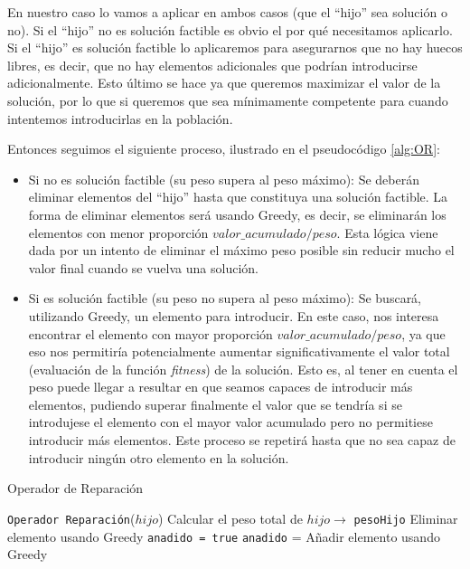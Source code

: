 En nuestro caso lo vamos a aplicar en ambos casos (que el ``hijo'' sea solución o no). 
Si el ``hijo'' no es solución factible es obvio el por qué necesitamos aplicarlo. 
Si el ``hijo'' es solución factible lo aplicaremos para asegurarnos que no hay huecos libres, es decir, que no hay elementos adicionales que podrían introducirse adicionalmente. 
Esto último se hace ya que queremos maximizar el valor de la solución, por lo que si queremos que sea mínimamente competente para cuando intentemos introducirlas en la población. 

Entonces seguimos el siguiente proceso, ilustrado en el pseudocódigo \ref{alg:OR}:
\begin{itemize}
	\item Si no es solución factible (su peso supera al peso máximo): Se deberán eliminar elementos del ``hijo'' hasta que constituya una solución factible. 
La forma de eliminar elementos será usando Greedy, es decir, se eliminarán los elementos con menor proporción $valor\_acumulado/peso$. 
Esta lógica viene dada por un intento de eliminar el máximo peso posible sin reducir mucho el valor final cuando se vuelva una solución. 
	
	\item Si es solución factible (su peso no supera al peso máximo): Se buscará, utilizando Greedy, un elemento para introducir. 
En este caso, nos interesa encontrar el elemento con mayor proporción $valor\_acumulado/peso$, ya que eso nos permitiría potencialmente aumentar significativamente el valor total (evaluación de la función \textit{fitness}) de la solución. 
Esto es, al tener en cuenta el peso puede llegar a resultar en que seamos capaces de introducir más elementos, pudiendo superar finalmente el valor que se tendría si se introdujese el elemento con el mayor valor acumulado pero no permitiese introducir más elementos. 
Este proceso se repetirá hasta que no sea capaz de introducir ningún otro elemento en la solución. 
\end{itemize}


\begin{algorithm}
\caption{Operador de Reparación}\label{alg:OR}
\begin{algorithmic}[1]
\Procedure \texttt{Operador Reparación}($hijo$)
\State Calcular el peso total de $hijo \xrightarrow{}{}$ \texttt{pesoHijo}
		\State Eliminar elemento usando Greedy
	\EndWhile
\Else
	\State \texttt{anadido = true} 
		\State \texttt{anadido} = Añadir elemento usando Greedy
	\EndWhile
\EndIf
\EndProcedure
\end{algorithmic}
\end{algorithm}

